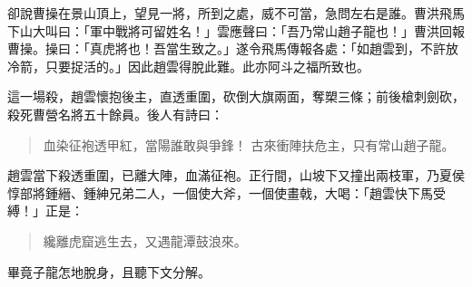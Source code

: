 卻說曹操在景山頂上，望見一將，所到之處，威不可當，急問左右是誰。曹洪飛馬下山大叫曰：「軍中戰將可留姓名！」雲應聲曰：「吾乃常山趙子龍也！」曹洪回報曹操。操曰：「真虎將也！吾當生致之。」遂令飛馬傳報各處：「如趙雲到，不許放冷箭，只要捉活的。」因此趙雲得脫此難。此亦阿斗之福所致也。

這一場殺，趙雲懷抱後主，直透重圍，砍倒大旗兩面，奪槊三條；前後槍刺劍砍，殺死曹營名將五十餘員。後人有詩曰：

\begin{quote}
血染征袍透甲紅，當陽誰敢與爭鋒！
古來衝陣扶危主，只有常山趙子龍。
\end{quote}

趙雲當下殺透重圍，已離大陣，血滿征袍。正行間，山坡下又撞出兩枝軍，乃夏侯惇部將鍾縉、鍾紳兄弟二人，一個使大斧，一個使畫戟，大喝：「趙雲快下馬受縛！」正是：

\begin{quote}
纔離虎窟逃生去，又遇龍潭鼓浪來。
\end{quote}

畢竟子龍怎地脫身，且聽下文分解。
